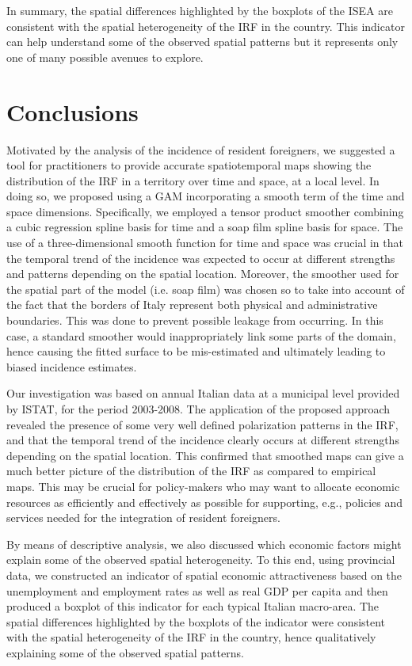 In summary, the spatial differences highlighted by the boxplots of the ISEA are consistent with the spatial heterogeneity of the IRF in the country. This indicator can help understand some of the observed spatial patterns but it represents only one of many possible avenues to explore.


\section{Conclusions}

Motivated by the analysis of the incidence of resident foreigners, we suggested a tool for practitioners to provide accurate spatiotemporal maps showing the distribution of the IRF in a territory over time and space, at a local level. In doing so, we proposed using a GAM incorporating a smooth term of the time and space dimensions. Specifically, we employed a tensor product smoother combining a cubic regression spline basis for time and a soap film spline basis for space. The use of a three-dimensional smooth function for time and space was crucial in that the temporal trend of the incidence was expected to occur at different strengths and patterns depending on the spatial location. Moreover, the smoother used for the spatial part of the model (i.e. soap film) was chosen so to take into account of the fact that the borders of Italy represent both physical and administrative boundaries. This was done to prevent possible leakage from occurring. In this case, a standard smoother would inappropriately link some parts of the domain, hence causing the fitted surface to be mis-estimated and ultimately leading to biased incidence estimates.

Our investigation was based on annual Italian data at a municipal level provided by ISTAT, for the period 2003-2008. The application of the proposed approach revealed the presence of some very well defined polarization patterns in the IRF, and that the temporal trend of the incidence clearly occurs at different strengths depending on the spatial location. This confirmed that smoothed maps can give a much better picture of the distribution of the IRF as compared to empirical maps. This may be crucial for policy-makers who may want to allocate economic resources as efficiently and effectively as possible for supporting, e.g., policies and services needed for the integration of resident foreigners.

By means of descriptive analysis, we also discussed which economic factors might explain some of the observed spatial heterogeneity. To this end, using provincial data, we constructed an indicator of spatial economic attractiveness based on the unemployment and employment rates as well as real GDP per capita and then produced a boxplot of this indicator for each typical Italian macro-area. The spatial differences highlighted by the boxplots of the indicator were consistent with the spatial heterogeneity of the IRF in the country, hence qualitatively explaining some of the observed spatial patterns.

